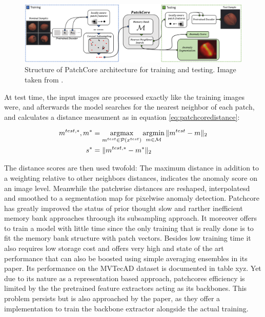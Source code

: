 \begin{figure}[ht]
    \centering
    \includegraphics[width=\textwidth]{figures/pathcore_architecture.png}
    \caption{Structure of PatchCore architecture for training and testing. Image taken from \cite{patchCore2022}.}
    \label{fig:patchcorearchitecture}
\end{figure}

At test time, the input images are processed exactly like the training images were, and afterwards the model searches for the nearest neighbor of each patch, and calculates a distance measument as 
in equation \ref{eq:patchcoredistance}:

\begin{equation}
\label{eq:patchcoredistance}
\begin{split}
m^{test, *}, m^{*} &= \operatorname*{argmax}_{m^{test} \in \mathcal{P}(x^{test})} \operatorname*{argmin}_{m \in \mathcal{M}} \| m^{test} - m \|_{2} \\
s^{*} &= \| m^{test, *} - m^{*} \|_{2}
\end{split}
\end{equation}

The distance scores are then used twofold: The maximum distance in addition to a weighting relative to other neighbors distances, indicates the anomaly score on an image level. Meanwhile the patchwise distances are reshaped, 
interpolatesd and smoothed to a segmentation map for pixelwise anomaly detection.
\newline
Patchcore has greatly improved the status of prior thought slow and rarther inefficient memory bank approaches throough its subsampling approach. It moreover offers to train a model with little time 
since the only training that is really done is to fit the memory bank structure with patch vectors. Besides low training time it also requires low storage cost and offers very high and state of the art 
performance that can also be boosted using simple averaging ensembles in its paper. Its performance on the MVTecAD dataset \cite{MVTEC_Bergmann_2021} is documented in table xyz. Yet due to its nature as a representation based approach, patchcores 
efficiency is limited by the the pretrained feature extractors acting as its backbones. This problem persists but is also approached by the paper, as they offer a implementation to train the backbone 
extractor alongside the actual training.


